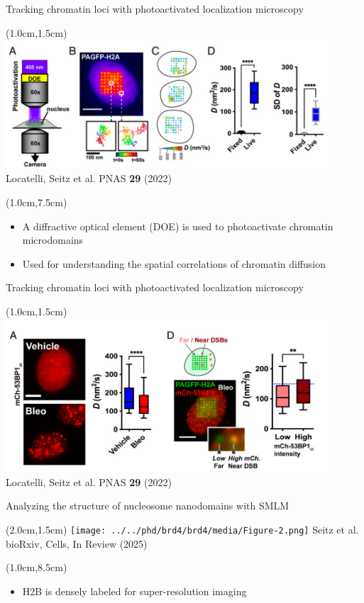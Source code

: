 \documentclass{beamer}					%
\begin{document}
\begin{frame}{Tracking chromatin loci with photoactivated localization microscopy}
\begin{textblock*}{12cm}(1.0cm,1.5cm)
\includegraphics[width=12cm]{../../postdoc/sartorius/media/DOE.png}
Locatelli, Seitz et al. PNAS \textbf{29} (2022)
\end{textblock*}
\begin{textblock*}{14cm}(1.0cm,7.5cm)
\begin{itemize}
\item A diffractive optical element (DOE) is used to photoactivate chromatin microdomains
\item Used for understanding the spatial correlations of chromatin diffusion
\end{itemize}
\end{textblock*}
\end{frame}

\begin{frame}{Tracking chromatin loci with photoactivated localization microscopy}
\begin{textblock*}{12cm}(1.0cm,1.5cm)
\includegraphics[width=12cm]{../../postdoc/sartorius/media/Bleo.png}
Locatelli, Seitz et al. PNAS \textbf{29} (2022)
\end{textblock*}
\end{frame}


\begin{frame}{Analyzing the structure of nucleosome nanodomains with SMLM}
\begin{textblock*}{10cm}(2.0cm,1.5cm)
\texttt{[image: ../../phd/brd4/brd4/media/Figure-2.png]}
Seitz et al. bioRxiv, Cells, In Review (2025)
\end{textblock*}

\begin{textblock*}{13cm}(1.0cm,8.5cm)
\begin{itemize}
\item H2B is densely labeled for super-resolution imaging
\end{itemize}
\end{textblock*}
\end{frame}
\end{document}
